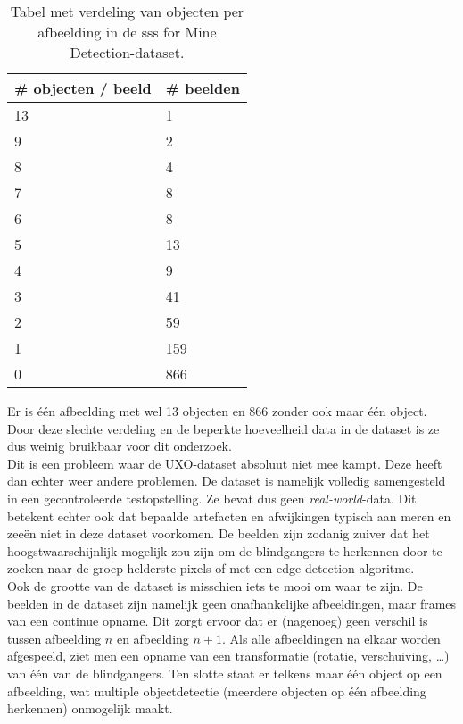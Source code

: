 \begin{table}[H]
    \centering
    \begin{tabular}{ll}
        \toprule
        \textbf{\# objecten / beeld} & \textbf{\# beelden} \\
        \midrule
        13 & 1 \\
        9  & 2 \\
        8  & 4 \\
        7  & 8 \\
        6  & 8 \\
        5  & 13 \\
        4  & 9 \\
        3  & 41 \\
        2  & 59 \\
        1  & 159 \\
        0  & 866 \\
        \bottomrule
    \end{tabular}
    \caption[Aantal objecten per afbeelding in SSS for Mine Data]{\label{tab:objects_per_image_sss} Tabel met verdeling van objecten per afbeelding in de \gls{sss} for Mine Detection-dataset.}
\end{table}

Er is één afbeelding met wel 13 objecten en 866 zonder ook maar één object. Door deze slechte verdeling en de beperkte hoeveelheid data in de dataset is ze dus weinig bruikbaar voor dit onderzoek. \\

Dit is een probleem waar de UXO-dataset absoluut niet mee kampt. Deze heeft dan echter weer andere problemen. De dataset is namelijk volledig samengesteld in een gecontroleerde testopstelling. Ze bevat dus geen \emph{real-world}-data. Dit betekent echter ook dat bepaalde artefacten en afwijkingen typisch aan meren en zeeën niet in deze dataset voorkomen. De beelden zijn zodanig zuiver dat het hoogstwaarschijnlijk mogelijk zou zijn om de \glspl{blindganger} te herkennen door te zoeken naar de groep helderste pixels of met een edge-detection algoritme. \autocite{Torre_1986} \\

Ook de grootte van de dataset is misschien iets te mooi om waar te zijn. De beelden in de dataset zijn namelijk geen onafhankelijke afbeeldingen, maar frames van een continue opname. Dit zorgt ervoor dat er (nagenoeg) geen verschil is tussen afbeelding $n$ en afbeelding $n+1$. Als alle afbeeldingen na elkaar worden afgespeeld, ziet men een opname van een transformatie (rotatie, verschuiving, \dots) van één van de \glspl{blindganger}. Ten slotte staat er telkens maar één object op een afbeelding, wat multiple objectdetectie (meerdere objecten op één afbeelding herkennen) onmogelijk maakt.

